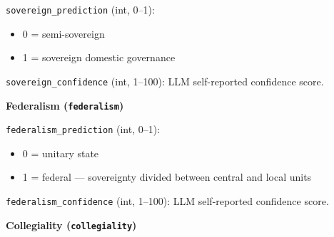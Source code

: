 \documentclass[11pt, a4paper]{article}
\newenvironment{promptquote}{%
  \begin{quote}\small
}{%
  \end{quote}
}
\begin{document}
\texttt{sovereign\_prediction} (int, 0--1):
\begin{itemize}[nosep, leftmargin=1.7em]
  \item 0 = semi-sovereign
  \item 1 = sovereign domestic governance
\end{itemize}
\texttt{sovereign\_confidence} (int, 1--100): LLM self-reported confidence score.

\bigskip
\textbf{Federalism (\texttt{federalism})}



\texttt{federalism\_prediction} (int, 0--1):
\begin{itemize}[nosep, leftmargin=1.7em]
  \item 0 = unitary state
  \item 1 = federal --- sovereignty divided between central and local units
\end{itemize}
\texttt{federalism\_confidence} (int, 1--100): LLM self-reported confidence score.

\bigskip
\textbf{Collegiality (\texttt{collegiality})}

\end{document}
